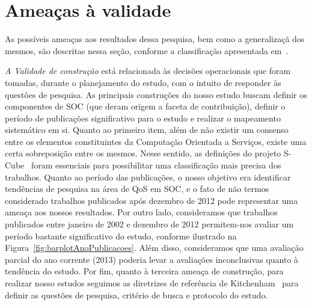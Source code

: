 \section{Amea\c cas à validade}\label{sec:ameacas}

As poss\'{i}veis amea\c{c}as aos resultados dessa pesquisa, bem como a generaliza\c c\~{a} dos mesmos, s\~{a}o descritas nessa se\c c\~{a}o, conforme a classifica\c c\~{a}o apresentada em~\cite{leedy1980practical}. 

\emph{A Validade de constru\c c\~{a}o} est\'{a} relacionada
\`{a}s decis\~{o}es operacionais que foram tomadas, durante o
planejamento do estudo, com o intuito de responder \`{a}s quest\~{o}es de
pesquisa. As principais constru\c{c}\~{o}es do nosso estudo buscam definir os componentes de SOC (que deram 
origem a faceta de contribui\c c\~{a}o), definir o per\'{i}odo de publica\c{c}\~{o}es significativo para o estudo e realizar o mapeamento sistemático em si. 
Quanto ao primeiro item, al\'{e}m de n\~{a}o existir um consenso entre os elementos constituintes da Computa\c c\~{a}o Orientada a Servi\c cos, existe uma certa 
sobreposi\c c\~{a}o entre os mesmos. Nesse sentido, as defini\c c\~{o}es do projeto S-Cube~\cite{SCube-FINALREPORT}  foram essenciais para 
possibilitar uma classifica\c c\~{a}o mais precisa dos trabalhos.
Quanto ao per\'{i}odo das publica\c c\~{o}es, o nosso objetivo era identificar tend\^{e}ncias de pesquisa na \'{a}rea de QoS em SOC, e o fato de n\~{a}o termos considerado trabalhos publicados ap\'{o}s dezembro de 2012 pode representar uma amea\c ca aos nossos resultados. Por outro lado, consideramos que trabalhos publicados entre janeiro de 2002 e dezembro de 2012 permitem-nos avaliar um per\'{i}odo bastante significativo do estudo, conforme ilustrado na Figura~\ref{fig:barplotAnoPublicacoes}. Al\'{e}m disso, consideramos que uma avalia\c c\~{a}o parcial do ano corrente (2013) poderia levar a avalia\c{c}\~{o}es inconclusivas quanto \`{a} tend\^{e}ncia do estudo. Por fim, quanto \`{a} terceira amea\c{c}a de constru\c{c}\~{a}o, para realizar nosso estudos seguimos as diretrizes de refer\^{e}ncia de Kitchenham~\cite{kitchenham:techReport2007} para definir as quest\~{o}es de pesquisa, crit\'{e}rio de busca e protocolo do estudo.


